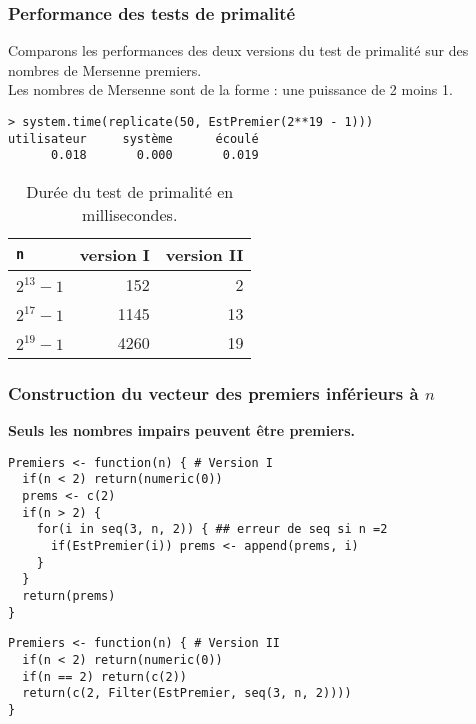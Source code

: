 \documentclass[10pt]{beamer}
\begin{document}
\begin{frame}[fragile]
  \frametitle{Performance des tests de primalité }

  Comparons les performances des deux versions du test de primalité  sur des nombres de Mersenne premiers. \\
  Les nombres de Mersenne sont de la forme : une puissance de 2 moins 1.

  \begin{lstlisting}
> system.time(replicate(50, EstPremier(2**19 - 1)))
utilisateur     système      écoulé
      0.018       0.000       0.019
  \end{lstlisting}

  \begin{table}[ht]
    \centering
    \begin{tabular}{l|rr}
      \toprule
      \texttt{n} & version I & version II \\
      \midrule
      $2^{13}-1$ & 152       & 2          \\
      $2^{17}-1$ & 1145      & 13         \\
      $2^{19}-1$ & 4260      & 19         \\
      \bottomrule
    \end{tabular}
    \caption{Durée du test de primalité en millisecondes.}
  \end{table}

\end{frame}


\begin{frame}[fragile]
  \frametitle{Construction du vecteur des premiers inférieurs à $n$ }

  \textbf{Seuls les nombres impairs peuvent être premiers.}

\begin{lstlisting}[style=editor]
Premiers <- function(n) { # Version I
  if(n < 2) return(numeric(0))
  prems <- c(2)
  if(n > 2) {
    for(i in seq(3, n, 2)) { ## erreur de seq si n =2
      if(EstPremier(i)) prems <- append(prems, i)
    }
  }
  return(prems)
}
\end{lstlisting}


\begin{lstlisting}[style=editor]
Premiers <- function(n) { # Version II
  if(n < 2) return(numeric(0))
  if(n == 2) return(c(2))
  return(c(2, Filter(EstPremier, seq(3, n, 2))))
}
\end{lstlisting}

\end{frame}
\end{document}
